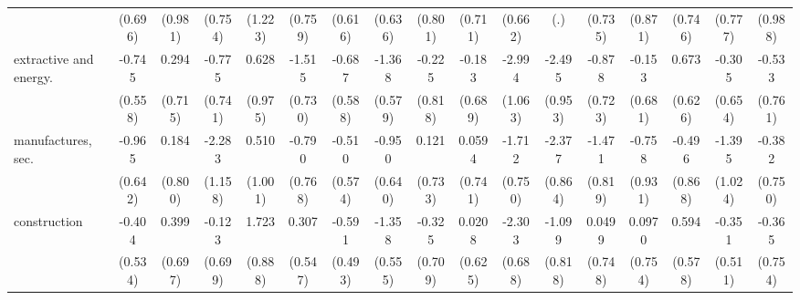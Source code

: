 {\begin{tabular}{l*{16}{c}}
                    &     (0.696)         &     (0.981)         &     (0.754)         &     (1.223)         &     (0.759)         &     (0.616)         &     (0.636)         &     (0.801)         &     (0.711)         &     (0.662)         &         (.)         &     (0.735)         &     (0.871)         &     (0.746)         &     (0.777)         &     (0.988)         \\
[1em]
extractive and energy.&      -0.745         &       0.294         &      -0.775         &       0.628         &      -1.515\sym{*}  &      -0.687         &      -1.368\sym{*}  &      -0.225         &      -0.183         &      -2.994\sym{**} &      -2.495\sym{**} &      -0.878         &      -0.153         &       0.673         &      -0.305         &      -0.533         \\
                    &     (0.558)         &     (0.715)         &     (0.741)         &     (0.975)         &     (0.730)         &     (0.588)         &     (0.579)         &     (0.818)         &     (0.689)         &     (1.063)         &     (0.953)         &     (0.723)         &     (0.681)         &     (0.626)         &     (0.654)         &     (0.761)         \\
[1em]
manufactures, sec.  &      -0.965         &       0.184         &      -2.283\sym{*}  &       0.510         &      -0.790         &      -0.510         &      -0.950         &       0.121         &      0.0594         &      -1.712\sym{*}  &      -2.377\sym{**} &      -1.471         &      -0.758         &      -0.496         &      -1.395         &      -0.382         \\
                    &     (0.642)         &     (0.800)         &     (1.158)         &     (1.001)         &     (0.768)         &     (0.574)         &     (0.640)         &     (0.733)         &     (0.741)         &     (0.750)         &     (0.864)         &     (0.819)         &     (0.931)         &     (0.868)         &     (1.024)         &     (0.750)         \\
[1em]
construction        &      -0.404         &       0.399         &      -0.123         &       1.723         &       0.307         &      -0.591         &      -1.358\sym{*}  &      -0.325         &      0.0208         &      -2.303\sym{***}&      -1.099         &      0.0499         &      0.0970         &       0.594         &      -0.351         &      -0.365         \\
                    &     (0.534)         &     (0.697)         &     (0.699)         &     (0.888)         &     (0.547)         &     (0.493)         &     (0.555)         &     (0.709)         &     (0.625)         &     (0.688)         &     (0.818)         &     (0.748)         &     (0.754)         &     (0.578)         &     (0.511)         &     (0.754)         \\

\end{tabular}}
